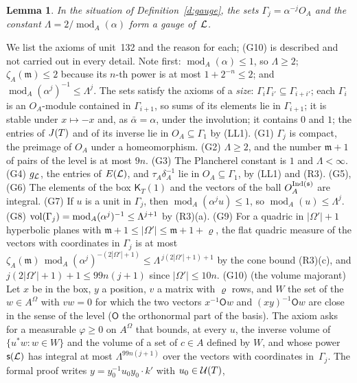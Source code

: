 \documentclass[11pt,a4paper]{article}
\makeatletter
\theoremstyle{plainx}
\newtheorem{lemma}[theorem]{Lemma}
\theoremstyle{uprightx}
\renewenvironment{proof}[1][Proof]{\par\pushQED{\qed}\normalfont\topsep0pt\partopsep0pt
  \trivlist\item[\hskip\labelsep\itshape #1.]\ignorespaces}{\popQED\endtrivlist\@endpefalse}
\newcommand{\modA}{\operatorname{mod}_A}              %
\newcommand{\gL}[1]{g_{#1}}                           %
\newcommand{\EL}[1]{E(#1)}                            %
\newcommand{\volumeExponent}[1]{\mathsf{s}(#1)}       %
\newcommand{\uLev}[2]{\mathsf{K}_{#2}(#1)}                     %
\newcommand{\zetaA}[1]{\zeta_{A}(#1)}                 %
\newcommand{\Inp}[1]{\textup{(#1)}}
\makeatother
\begin{document}
\begin{lemma}\label{l:gauge}
In the situation of Definition~\ref{d:gauge}, the sets $\Gamma_j=\alpha^{-j}O_A$ and the constant
$\Lambda=2/\modA(\alpha)$ form a gauge of~$\mathcal{L}$.
\end{lemma}
\begin{proof}
We list the axioms of unit~132 and the reason for each; (G10) is described and not carried out in every detail.
Note first: $\modA(\alpha)\le1$, so $\Lambda\ge2$; $\zetaA{\mathfrak{m}}\le2$ because its $n$-th power is at most
$1+2^{-n}\le2$; and $\modA(\alpha^{j})^{-1}\le\Lambda^{j}$. The sets satisfy the axioms of a \emph{size}:
$\Gamma_i\Gamma_{i'}\subseteq\Gamma_{i+i'}$; each $\Gamma_i$ is an $O_A$-module contained in $\Gamma_{i+1}$, so sums of
its elements lie in $\Gamma_{i+1}$; it is stable under $x\mapsto-x$ and, as $\bar\alpha=\alpha$, under the involution;
it contains $0$ and $1$; the entries of $J(T)$ and of its inverse lie in $O_A\subseteq\Gamma_1$ by (LL1).
(G1) $\Gamma_j$ is compact, the preimage of $O_A$ under a homeomorphism. (G2) $\Lambda\ge2$, and the number
$\mathfrak{m}+1$ of pairs of the level is at most $9n$. (G3) The Plancherel constant is $1$ and $\Lambda<\infty$.
(G4) $\gL{\cL}$, the entries of $\EL{\cL}$, and $\tau_A\delta_A^{-1}$ lie in $O_A\subseteq\Gamma_1$, by (LL1) and
\Inp{R3}. (G5), (G6) The elements of the box $\uLev{1}{T}$ and the vectors of the ball $O_A^{\operatorname{Ind}(\mathfrak{s})}$ are integral.
(G7) If $u$ is a unit in $\Gamma_j$, then $\modA(\alpha^{j}u)\le1$, so $\modA(u)\le\Lambda^{j}$. (G8)
$\vol(\Gamma_j)=\modA(\alpha^{j})^{-1}\le\Lambda^{j+1}$ by \Inp{R3}(a). (G9) For a quadric in $|\Omega'|+1$ hyperbolic
planes with $\mathfrak{m}+1\le|\Omega'|\le\mathfrak{m}+1+\varrho$, the flat quadric measure of the vectors with
coordinates in $\Gamma_j$ is at most $\zetaA{\mathfrak{m}}\,\modA(\alpha^{j})^{-(2|\Omega'|+1)}\le\Lambda^{\,j(2|\Omega'|+1)+1}$
by the cone bound \Inp{R3}(c), and $j(2|\Omega'|+1)+1\le99n(j+1)$ since $|\Omega'|\le10n$. (G10) (the volume
majorant) Let $x$ be in the box, $y$ a position, $v$ a matrix with $\varrho$ rows, and $W$ the set of the
$w\in A^{\Omega}$ with $vw=0$ for which the two vectors $x^{-1}\mathsf{O}w$ and $(xy)^{-1}\mathsf{O}w$ are close in the
sense of the level ($\mathsf{O}$ the orthonormal part of the basis). The axiom asks for a measurable
$\varphi\ge0$ on $A^{\Omega}$ that bounds, at every $u$, the inverse volume of $\{u^{*}w:w\in W\}$ and the volume of
a set of $c\in A$ defined by $W$, and whose power $\volumeExponent{\cL}$ has integral at most $\Lambda^{99n(j+1)}$ over
the vectors with coordinates in~$\Gamma_j$. The formal proof writes $y=y_0^{-1}u_0y_0\cdot k'$ with $u_0\in\mathcal{U}(T)$,

\end{proof}
\end{document}
